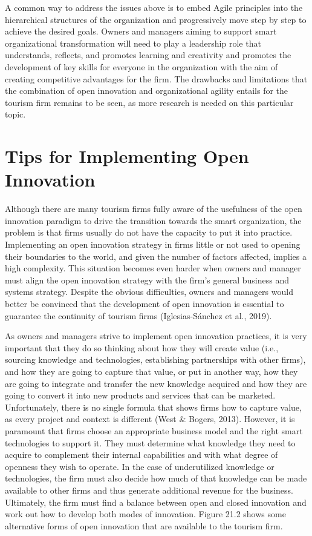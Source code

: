 \documentclass[
  letterpaper,
  DIV=11,
  numbers=noendperiod]{scrreprt}
\begin{document}
A common way to address the issues above is to embed Agile principles
into the hierarchical structures of the organization and progressively
move step by step to achieve the desired goals. Owners and managers
aiming to support smart organizational transformation will need to play
a leadership role that understands, reflects, and promotes learning and
creativity and promotes the development of key skills for everyone in
the organization with the aim of creating competitive advantages for the
firm. The drawbacks and limitations that the combination of open
innovation and organizational agility entails for the tourism firm
remains to be seen, as more research is needed on this particular topic.

\hypertarget{tips-for-implementing-open-innovation}{%
\section{Tips for Implementing Open
Innovation}\label{tips-for-implementing-open-innovation}}

Although there are many tourism firms fully aware of the usefulness of
the open innovation paradigm to drive the transition towards the smart
organization, the problem is that firms usually do not have the capacity
to put it into practice. Implementing an open innovation strategy in
firms little or not used to opening their boundaries to the world, and
given the number of factors affected, implies a high complexity. This
situation becomes even harder when owners and manager must align the
open innovation strategy with the firm's general business and systems
strategy. Despite the obvious difficulties, owners and managers would
better be convinced that the development of open innovation is essential
to guarantee the continuity of tourism firms (Iglesias-Sánchez et al.,
2019).

As owners and managers strive to implement open innovation practices, it
is very important that they do so thinking about how they will create
value (i.e., sourcing knowledge and technologies, establishing
partnerships with other firms), and how they are going to capture that
value, or put in another way, how they are going to integrate and
transfer the new knowledge acquired and how they are going to convert it
into new products and services that can be marketed. Unfortunately,
there is no single formula that shows firms how to capture value, as
every project and context is different (West \& Bogers, 2013). However,
it is paramount that firms choose an appropriate business model and the
right smart technologies to support it. They must determine what
knowledge they need to acquire to complement their internal capabilities
and with what degree of openness they wish to operate. In the case of
underutilized knowledge or technologies, the firm must also decide how
much of that knowledge can be made available to other firms and thus
generate additional revenue for the business. Ultimately, the firm must
find a balance between open and closed innovation and work out how to
develop both modes of innovation. Figure 21.2 shows some alternative
forms of open innovation that are available to the tourism firm.
\end{document}
